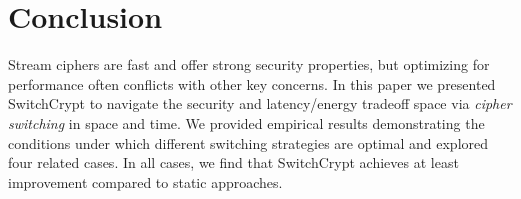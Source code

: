 \section{Conclusion}\label{sec:conclusion}

Stream ciphers are fast and offer strong security properties, but optimizing for
performance often conflicts with other key concerns. In this paper we presented
SwitchCrypt to navigate the security and latency/energy tradeoff space via
\emph{cipher switching} in space and time. We provided empirical results
demonstrating the conditions under which different switching strategies are
optimal and explored four related cases. In all cases, we find that SwitchCrypt
achieves at least  improvement compared to static approaches.

